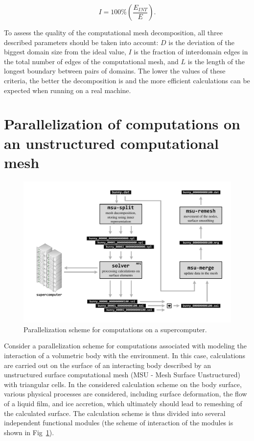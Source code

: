 \documentclass[
11pt,%
tightenlines,%
twoside,%
onecolumn,%
nofloats,%
nobibnotes,%
nofootinbib,%
superscriptaddress,%
noshowpacs,%
centertags]%
{revtex4}
\begin{document}
\begin{equation}
I = 100 \% \left( \frac{E_{INT}}{E} \right).
\end{equation}

To assess the quality of the computational mesh decomposition, all three described parameters should be taken into account: $ D $ is the deviation of the biggest domain size from the ideal value, $ I $ is the fraction of interdomain edges in the total number of edges of the computational mesh, and $ L $ is the length of the longest boundary between pairs of domains.
The lower the values of these criteria, the better the decomposition is and the more efficient calculations can be expected when running on a real machine.

\section{Parallelization of computations on an unstructured computational mesh}

\begin{figure}[h]
\includegraphics[width=1.0\textwidth]{pics/02-scheme.pdf}
\caption{Parallelization scheme for computations on a supercomputer.}\label{fig:02-scheme}
\end{figure}

Consider a parallelization scheme for computations associated with modeling the interaction of a volumetric body with the environment.
In this case, calculations are carried out on the surface of an interacting body described by an unstructured surface computational mesh (MSU - Mesh Surface Unstructured) with triangular cells.
In the considered calculation scheme on the body surface, various physical processes are considered, including surface deformation, the flow of a liquid film, and ice accretion, which ultimately should lead to remeshing of the calculated surface.
The calculation scheme is thus divided into several independent functional modules (the scheme of interaction of the modules is shown in Fig~\ref{fig:02-scheme}).
\end{document}
